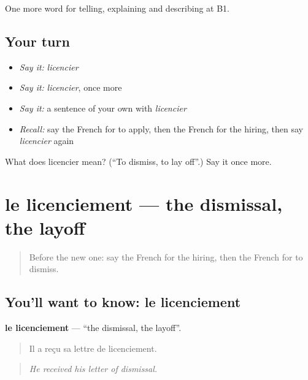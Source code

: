 \begin{grammarlens}[title={What you've built}]
One more word for telling, explaining and describing at B1.
\end{grammarlens}

\subsection*{Your turn}
\begin{itemize}
\raggedright
  \item \emph{Say it:} \emph{licencier}
  \item \emph{Say it:} \emph{licencier}, once more
  \item \emph{Say it:} a sentence of your own with \emph{licencier}
  \item \emph{Recall:} say the French for to apply, then the French for the hiring, then say \emph{licencier} again
\end{itemize}

\begin{tcolorbox}[breakable,colback=teal!4,colframe=teal!35!black,title={Before you move on}]
What does licencier mean? (\textquotedblleft{}To dismiss, to lay off\textquotedblright{}.) Say it once more.
\end{tcolorbox}
\section[le licenciement]{le licenciement — the dismissal, the layoff}

\label{lesson:FR-C355-licenciement}



\begin{quote}
Before the new one: say the French for the hiring, then the French for to dismiss.
\end{quote}

\subsection*{You'll want to know: le licenciement}
\textbf{le licenciement} — \textquotedblleft{}the dismissal, the layoff\textquotedblright{}.

\begin{quote}
Il a reçu sa lettre de licenciement.
\end{quote}

\begin{quote}
\emph{He received his letter of dismissal.}
\end{quote}

